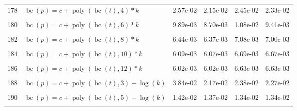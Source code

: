 \documentclass[12pt,a4paper]{article}
\DeclareMathOperator{\bc}{bc}
\DeclareMathOperator{\poly}{poly}
\begin{document}
\begin{longtable}[t]{ll>{\raggedleft\arraybackslash}p{2cm}>{\raggedleft\arraybackslash}p{2cm}>{\raggedleft\arraybackslash}p{2cm}>{\raggedleft\arraybackslash}p{2cm}}
178 & $\bc(p) = c + \poly\left( \bc(t), 4 \right) * k$ & 2.57e-02 & 2.15e-02 & 2.45e-02 & 2.33e-02\\
\cellcolor{gray!6}{179} & \cellcolor{gray!6}{$\bc(p) = c + \poly\left( \bc(t), 5 \right) * k$} & \cellcolor{gray!6}{1.08e-02} & \cellcolor{gray!6}{1.06e-02} & \cellcolor{gray!6}{1.08e-02} & \cellcolor{gray!6}{1.08e-02}\\
180 & $\bc(p) = c + \poly\left( \bc(t), 6 \right) * k$ & 9.89e-03 & 8.70e-03 & 1.08e-02 & 9.41e-03\\
\cellcolor{gray!6}{181} & \cellcolor{gray!6}{$\bc(p) = c + \poly\left( \bc(t), 7 \right) * k$} & \cellcolor{gray!6}{8.31e-03} & \cellcolor{gray!6}{7.54e-03} & \cellcolor{gray!6}{8.63e-03} & \cellcolor{gray!6}{8.15e-03}\\
182 & $\bc(p) = c + \poly\left( \bc(t), 8 \right) * k$ & 6.44e-03 & 6.37e-03 & 7.08e-03 & 7.00e-03\\
\cellcolor{gray!6}{183} & \cellcolor{gray!6}{$\bc(p) = c + \poly\left( \bc(t), 9 \right) * k$} & \cellcolor{gray!6}{6.34e-03} & \cellcolor{gray!6}{6.29e-03} & \cellcolor{gray!6}{6.97e-03} & \cellcolor{gray!6}{6.91e-03}\\
184 & $\bc(p) = c + \poly\left( \bc(t), 10 \right) * k$ & 6.09e-03 & 6.07e-03 & 6.69e-03 & 6.67e-03\\
\cellcolor{gray!6}{185} & \cellcolor{gray!6}{$\bc(p) = c + \poly\left( \bc(t), 11 \right) * k$} & \cellcolor{gray!6}{6.05e-03} & \cellcolor{gray!6}{6.04e-03} & \cellcolor{gray!6}{6.66e-03} & \cellcolor{gray!6}{6.65e-03}\\
186 & $\bc(p) = c + \poly\left( \bc(t), 12 \right) * k$ & 6.02e-03 & 6.02e-03 & 6.63e-03 & 6.63e-03\\
\cellcolor{gray!6}{187} & \cellcolor{gray!6}{$\bc(p) = c + \poly\left( \bc(t), 13 \right) * k$} & \cellcolor{gray!6}{6.02e-03} & \cellcolor{gray!6}{6.02e-03} & \cellcolor{gray!6}{6.63e-03} & \cellcolor{gray!6}{6.63e-03}\\
188 & $\bc(p) = c + \poly\left( \bc(t), 3 \right) + \log(k)$ & 3.84e-02 & 2.17e-02 & 2.38e-02 & 2.27e-02\\
\cellcolor{gray!6}{189} & \cellcolor{gray!6}{$\bc(p) = c + \poly\left( \bc(t), 4 \right) + \log(k)$} & \cellcolor{gray!6}{2.87e-02} & \cellcolor{gray!6}{2.39e-02} & \cellcolor{gray!6}{2.66e-02} & \cellcolor{gray!6}{2.53e-02}\\
190 & $\bc(p) = c + \poly\left( \bc(t), 5 \right) + \log(k)$ & 1.42e-02 & 1.37e-02 & 1.34e-02 & 1.34e-02\\
\cellcolor{gray!6}{191} & \cellcolor{gray!6}{$\bc(p) = c + \poly\left( \bc(t), 6 \right) + \log(k)$} & \cellcolor{gray!6}{1.30e-02} & \cellcolor{gray!6}{1.21e-02} & \cellcolor{gray!6}{1.31e-02} & \cellcolor{gray!6}{1.21e-02}\\

\end{longtable}
\end{document}
